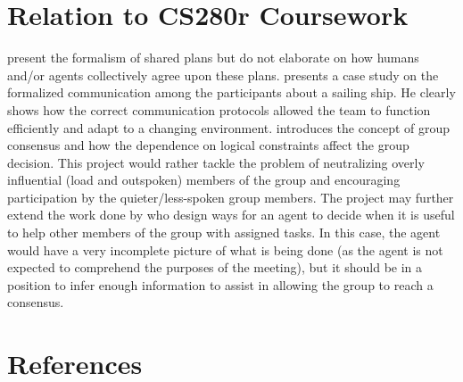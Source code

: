 \documentclass[final,authoryear,11pt,times]{elsarticle}
\begin{document}
\section{Relation to CS280r Coursework}
	\label{sec:coursework}
	\citet{grosz2006dynamics} present the formalism of shared plans but do not elaborate on how humans and/or agents collectively agree upon these plans. \citet{hutchins1995cognition} presents a case study on the formalized communication among the participants about a sailing ship. He clearly shows how the correct communication protocols allowed the team to function efficiently and adapt to a changing environment. \citet{friedkin2016network} introduces the concept of group consensus and how the dependence on logical constraints affect the group decision. This project would rather tackle the problem of neutralizing overly influential (load and outspoken) members of the group and encouraging participation by the quieter/less-spoken group members. The project may further extend the work done by \citet{kamar2009incorporating} who design ways for an agent to decide when it is useful to help other members of the group with assigned tasks. In this case, the agent would have a very incomplete picture of what is being done (as the agent is not expected to comprehend the purposes of the meeting), but it should be in a position to infer enough information to assist in allowing the group to reach a consensus.


\section{References}


\end{document}
